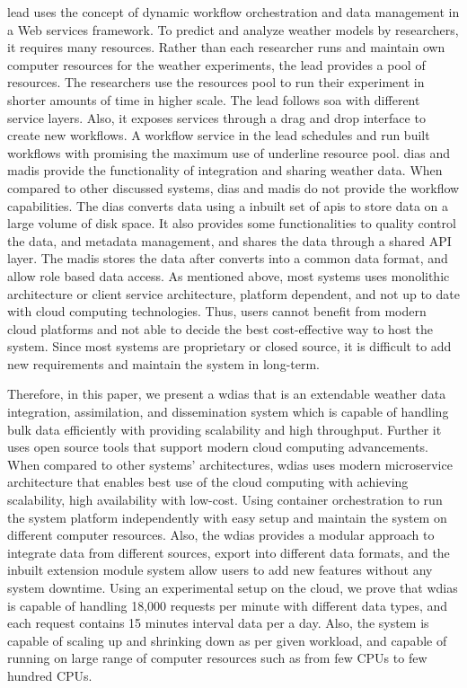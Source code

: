 \documentclass[conference]{IEEEtran}
\begin{document}
\acrfull{lead} \cite{Droegemeier2005Service-OrientedWeather} uses the concept of dynamic workflow orchestration and data management in a Web services framework. To predict and analyze weather models by researchers, it requires many resources. Rather than each researcher runs and maintain own computer resources for the weather experiments, the \acrshort{lead} provides a pool of resources. The researchers use the resources pool to run their experiment in shorter amounts of time in higher scale. The \acrshort{lead} follows \acrfull{soa} with different service layers. Also, it exposes services through a drag and drop interface to create new workflows. A workflow service in the \acrshort{lead} schedules and run built workflows with promising the maximum use of underline resource pool. \acrfull{dias} \cite{Kawasaki2018DataReduction} and \acrfull{madis} \cite{Macdermaid2005ArchitectureP2.39} provide the functionality of integration and sharing weather data. When compared to other discussed systems, \acrshort{dias} and \acrshort{madis} do not provide the workflow capabilities. The \acrshort{dias} converts data using a inbuilt set of \acrshort{api}s to store data on a large volume of disk space. It also provides some functionalities to quality control the data, and metadata management, and shares the data through a shared API layer. The \acrshort{madis} stores the data after converts into a common data format, and allow role based data access.
As mentioned above, most systems uses monolithic architecture or client service architecture, platform dependent, and not up to date with cloud computing technologies. Thus, users cannot benefit from modern cloud platforms and not able to decide the best cost-effective way to host the system. Since most systems are proprietary or closed source, it is difficult to add new requirements and maintain the system in long-term.

Therefore, in this paper, we present a \acrfull{wdias} that is an extendable weather data integration, assimilation, and dissemination system which is capable of handling bulk data efficiently with providing scalability and high throughput. Further it uses open source tools that support modern cloud computing advancements. When compared to other systems' architectures, \acrshort{wdias} uses modern microservice architecture that enables best use of the cloud computing with achieving scalability, high availability with low-cost. Using container orchestration to run the system platform independently with easy setup and maintain the system on different computer resources. Also, the \acrshort{wdias} provides a modular approach to integrate data from different sources, export into different data formats, and the inbuilt extension module system allow users to add new features without any system downtime.
Using an experimental setup on the cloud, we prove that \acrshort{wdias} is capable of handling 18,000 requests per minute with different data types, and each request contains 15 minutes interval data per a day. Also, the system is capable of scaling up and shrinking down as per given workload, and capable of running on large range of computer resources such as from few CPUs to few hundred CPUs.
\end{document}
